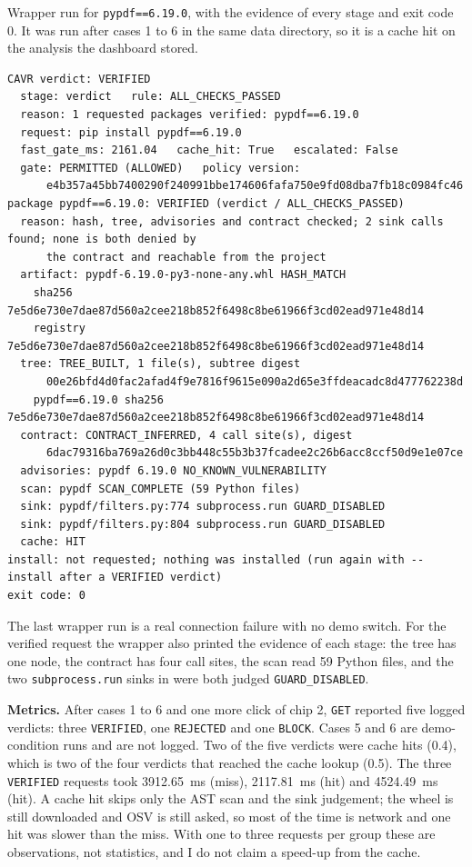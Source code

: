 \noindent Wrapper run for \texttt{pypdf==6.19.0}, with the evidence of every stage and exit code 0. It was run after cases 1 to 6 in the same data directory, so it is a cache hit on the analysis the dashboard stored.
\begin{singlespace}
\scriptsize
\begin{verbatim}
CAVR verdict: VERIFIED
  stage: verdict   rule: ALL_CHECKS_PASSED
  reason: 1 requested packages verified: pypdf==6.19.0
  request: pip install pypdf==6.19.0
  fast_gate_ms: 2161.04   cache_hit: True   escalated: False
  gate: PERMITTED (ALLOWED)   policy version:
      e4b357a45bb7400290f240991bbe174606fafa750e9fd08dba7fb18c0984fc46
package pypdf==6.19.0: VERIFIED (verdict / ALL_CHECKS_PASSED)
  reason: hash, tree, advisories and contract checked; 2 sink calls found; none is both denied by
      the contract and reachable from the project
  artifact: pypdf-6.19.0-py3-none-any.whl HASH_MATCH
    sha256 7e5d6e730e7dae87d560a2cee218b852f6498c8be61966f3cd02ead971e48d14
    registry 7e5d6e730e7dae87d560a2cee218b852f6498c8be61966f3cd02ead971e48d14
  tree: TREE_BUILT, 1 file(s), subtree digest
      00e26bfd4d0fac2afad4f9e7816f9615e090a2d65e3ffdeacadc8d477762238d
    pypdf==6.19.0 sha256 7e5d6e730e7dae87d560a2cee218b852f6498c8be61966f3cd02ead971e48d14
  contract: CONTRACT_INFERRED, 4 call site(s), digest
      6dac79316ba769a26d0c3bb448c55b3b37fcadee2c26b6acc8ccf50d9e1e07ce
  advisories: pypdf 6.19.0 NO_KNOWN_VULNERABILITY
  scan: pypdf SCAN_COMPLETE (59 Python files)
  sink: pypdf/filters.py:774 subprocess.run GUARD_DISABLED
  sink: pypdf/filters.py:804 subprocess.run GUARD_DISABLED
  cache: HIT
install: not requested; nothing was installed (run again with --install after a VERIFIED verdict)
exit code: 0
\end{verbatim}
\end{singlespace}

\begin{sloppypar}
The last wrapper run is a real connection failure with no demo switch. For the verified request the wrapper also printed the evidence of each stage: the tree has one node, the contract has four call sites, the scan read 59 Python files, and the two \texttt{subprocess.run} sinks in  were both judged \texttt{GUARD\_DISABLED}.
\end{sloppypar}

\begin{sloppypar}
\textbf{Metrics.} After cases 1 to 6 and one more click of chip 2, \texttt{GET}  reported five logged verdicts: three \texttt{VERIFIED}, one \texttt{REJECTED} and one \texttt{BLOCK}. Cases 5 and 6 are demo-condition runs and are not logged. Two of the five verdicts were cache hits (0.4), which is two of the four verdicts that reached the cache lookup (0.5). The three \texttt{VERIFIED} requests took 3912.65~ms (miss), 2117.81~ms (hit) and 4524.49~ms (hit). A cache hit skips only the AST scan and the sink judgement; the wheel is still downloaded and OSV is still asked, so most of the time is network and one hit was slower than the miss. With one to three requests per group these are observations, not statistics, and I do not claim a speed-up from the cache.
\end{sloppypar}

